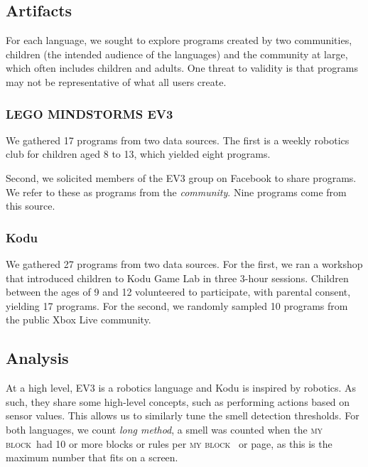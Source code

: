 \documentclass[conference]{IEEEtran}
\newcommand{\ms}{LEGO MINDSTORMS EV3}
\newcommand{\mb}{\textsc{my block}}
\begin{document}
\subsection{Artifacts}
For each language, we sought to explore programs created by two communities, children (the intended audience of the languages) and the community at large, which often includes children and adults. One threat to validity is that programs may not be representative of what all users create. 


\subsubsection{\ms}
We  gathered 17 programs from two data sources. The first is a weekly robotics club for children aged 8 to 13, which yielded eight programs. 

Second, we solicited members of the EV3 group on Facebook to share programs. We refer to these as programs from the \emph{community}. Nine programs come from this source. 


\subsubsection{Kodu}
We gathered 27  programs from two data sources. 
For the first, we ran a workshop that introduced children to Kodu Game Lab in three 3-hour sessions.  
Children between the ages of 9 and 12 volunteered to participate, with parental consent, yielding 17 programs. 
For the second, we randomly sampled 10 programs from the public Xbox Live community. 



\subsection{Analysis}
At a high level, EV3 is a robotics language and Kodu is inspired by robotics. As such, they share some high-level concepts, such as performing actions based on sensor values. This allows us to similarly tune the smell detection thresholds. For both languages, we count \emph{long method}, a smell was counted when the \mb~had 10 or more blocks or rules per \mb~ or page, as this is the maximum number that fits on a screen.
\end{document}
